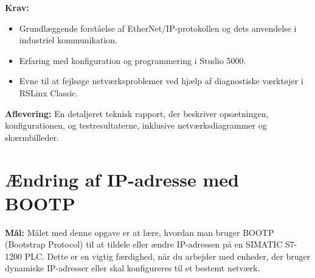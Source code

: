 \textbf{Krav:}
\begin{itemize}
	\item Grundlæggende forståelse af EtherNet/IP-protokollen og dets anvendelse i industriel kommunikation.
	\item Erfaring med konfiguration og programmering i Studio 5000.
	\item Evne til at fejlsøge netværksproblemer ved hjælp af diagnostiske værktøjer i RSLinx Classic.
\end{itemize}

\textbf{Aflevering:} En detaljeret teknisk rapport, der beskriver opsætningen, konfigurationen, og testresultaterne, inklusive netværksdiagrammer og skærmbilleder.


\section{Ændring af IP-adresse med BOOTP}
\label{subsec:bootp_ip_change}

\textbf{Mål:} Målet med denne opgave er at lære, hvordan man bruger BOOTP (Bootstrap Protocol) til at tildele eller ændre IP-adressen på en SIMATIC S7-1200 PLC. Dette er en vigtig færdighed, når du arbejder med enheder, der bruger dynamiske IP-adresser eller skal konfigureres til et bestemt netværk.

